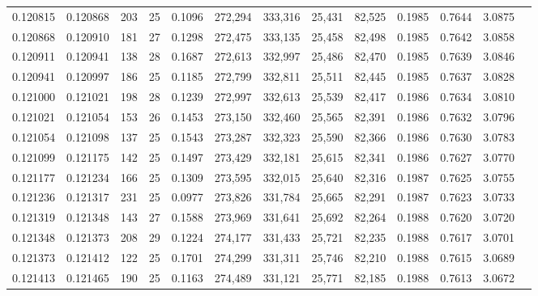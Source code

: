 \begin{tabular}{rrrrrrrrrrrrr}
0.120815 & 0.120868 & 203 &  25 &                                     0.1096 & 272,294 & 333,316 &  25,431 &  82,525 & 0.1985 & 0.7644 & 3.0875 \\
0.120868 & 0.120910 & 181 &  27 &                                     0.1298 & 272,475 & 333,135 &  25,458 &  82,498 & 0.1985 & 0.7642 & 3.0858 \\
0.120911 & 0.120941 & 138 &  28 &                                     0.1687 & 272,613 & 332,997 &  25,486 &  82,470 & 0.1985 & 0.7639 & 3.0846 \\
0.120941 & 0.120997 & 186 &  25 &                                     0.1185 & 272,799 & 332,811 &  25,511 &  82,445 & 0.1985 & 0.7637 & 3.0828 \\
0.121000 & 0.121021 & 198 &  28 &                                     0.1239 & 272,997 & 332,613 &  25,539 &  82,417 & 0.1986 & 0.7634 & 3.0810 \\
0.121021 & 0.121054 & 153 &  26 &                                     0.1453 & 273,150 & 332,460 &  25,565 &  82,391 & 0.1986 & 0.7632 & 3.0796 \\
0.121054 & 0.121098 & 137 &  25 &                                     0.1543 & 273,287 & 332,323 &  25,590 &  82,366 & 0.1986 & 0.7630 & 3.0783 \\
0.121099 & 0.121175 & 142 &  25 &                                     0.1497 & 273,429 & 332,181 &  25,615 &  82,341 & 0.1986 & 0.7627 & 3.0770 \\
0.121177 & 0.121234 & 166 &  25 &                                     0.1309 & 273,595 & 332,015 &  25,640 &  82,316 & 0.1987 & 0.7625 & 3.0755 \\
0.121236 & 0.121317 & 231 &  25 &                                     0.0977 & 273,826 & 331,784 &  25,665 &  82,291 & 0.1987 & 0.7623 & 3.0733 \\
0.121319 & 0.121348 & 143 &  27 &                                     0.1588 & 273,969 & 331,641 &  25,692 &  82,264 & 0.1988 & 0.7620 & 3.0720 \\
0.121348 & 0.121373 & 208 &  29 &                                     0.1224 & 274,177 & 331,433 &  25,721 &  82,235 & 0.1988 & 0.7617 & 3.0701 \\
0.121373 & 0.121412 & 122 &  25 &                                     0.1701 & 274,299 & 331,311 &  25,746 &  82,210 & 0.1988 & 0.7615 & 3.0689 \\
0.121413 & 0.121465 & 190 &  25 &                                     0.1163 & 274,489 & 331,121 &  25,771 &  82,185 & 0.1988 & 0.7613 & 3.0672 \\

\end{tabular}
